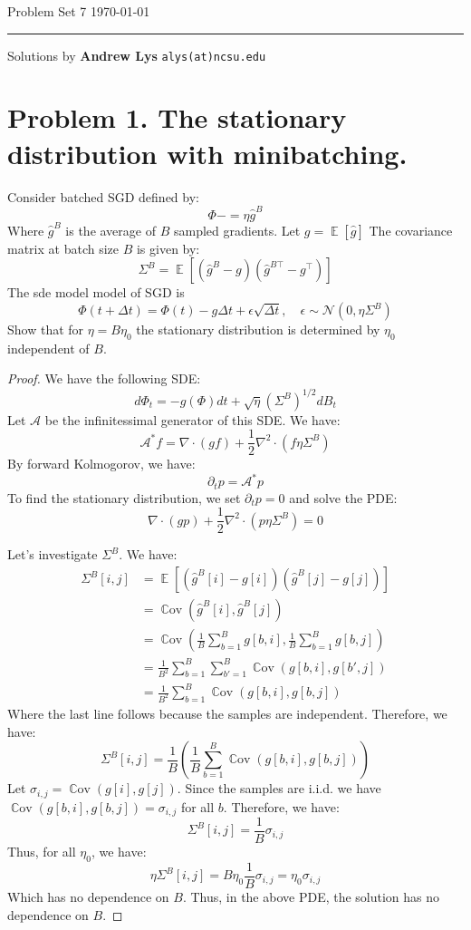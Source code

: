 \documentclass{amsart}
\newcommand{\cA}{\mathcal{A}}
\newcommand{\cN}{\mathcal{N}}
\newcommand{\Cov}[1]{\operatorname{\mathbb{C}ov}\left(#1\right)}
\newcommand{\ee}[1]{\operatorname{\mathbb{E}}\left[#1\right]}
\theoremstyle{definition}
\begin{document}
\noindent
Problem Set 7  \hfill \today  %
\smallskip
\hrule
\smallskip
\noindent
Solutions by {\bf Andrew Lys} \qquad   %
  {\tt alys(at)ncsu.edu}

\vspace{0.5cm}

\section*{Problem 1. The stationary distribution with minibatching.}
Consider batched SGD defined by:
\[
\Phi -= \eta \hat{g}^B
\]
Where $\hat{g}^B$ is the average of $B$ sampled gradients. 
Let $g = \ee{\hat{g}}$
The covariance matrix at batch size $B$ is given by:
\[
\Sigma^B = \ee{(\hat{g}^B - g)(\hat{g}^{B\top} - g^\top)}
\]
The sde model model of SGD is 
\[
\Phi(t + \Delta t) = \Phi(t) - g\Delta t + \epsilon \sqrt{\Delta t}, \quad \epsilon \sim \cN(0, \eta \Sigma^B)
\]
Show that for $\eta = B \eta_0$ the stationary distribution is determined by $\eta_0$ independent of $B$. 
\begin{proof}
We have the following SDE:
\[
d \Phi_t = - g(\Phi) d t + \sqrt{\eta} (\Sigma^B)^{1/2} d B_t
\]
Let $\cA$ be the infinitessimal generator of this SDE. 
We have:
\[
\cA^\ast f =  \nabla \cdot (g f) + \frac12 \nabla^2 \cdot (f \eta\Sigma^B)
\]
By forward Kolmogorov, we have:
\[
\partial_t p = \cA^\ast p 
\]
To find the stationary distribution, we set $\partial_t p = 0$ and solve the PDE:
\[
\nabla \cdot (g p) + \frac12 \nabla^2 \cdot (p \eta\Sigma^B) = 0
\]

Let's investigate $\Sigma^B$. We have:
\begin{align*}
  \Sigma^B[i,j] &= \ee{(\hat{g}^B[i] - g[i])(\hat{g}^B[j] - g[j])} \\
  &= \Cov{\hat{g}^B[i], \hat{g}^B[j]} \\
  &= \Cov{\frac{1}{B} \sum_{b = 1}^B g[b, i], \frac{1}{B} \sum_{b = 1}^B g[b, j]} \\
  &= \frac{1}{B^2} \sum_{b = 1}^B \sum_{b' = 1}^B \Cov{g[b, i], g[b', j]} \\
  &= \frac{1}{B^2} \sum_{b = 1}^B \Cov{g[b, i], g[b, j]} 
\end{align*}
Where the last line follows because the samples are independent.
Therefore, we have:
\[
\Sigma^B[i,j] = \frac1{B} \left(\frac1{B}\sum_{b = 1}^B \Cov{g[b,i], g[b,j]}\right)
\]
Let $\sigma_{i,j} = \Cov{g[i], g[j]}$. Since the samples are i.i.d. we have $\Cov{g[b,i], g[b,j]} = \sigma_{i,j}$ for all $b$. Therefore, we have:
\[
\Sigma^B[i,j] = \frac1{B} \sigma_{i,j}
\]
Thus, for all $\eta_0$, we have:
\[
\eta \Sigma^B[i,j] = B \eta_0 \frac1{B} \sigma_{i,j} = \eta_0 \sigma_{i,j}
\]
Which has no dependence on $B$. Thus, in the above PDE, the solution has no dependence on $B$.

\end{proof}
\end{document}

